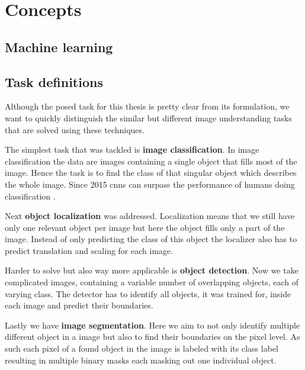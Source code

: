 %
\chapter{Concepts}
\label{sec:concepts}


\section{Machine learning}
\label{sec:concepts:ml}

\section{Task definitions}
\label{sec:concepts:tasks}
Although the posed task for this thesis is pretty clear from its formulation, we want to quickly distinguish the similar but different image understanding tasks that are solved using these techniques.

The simplest task that was tackled is \textbf{image classification}. In image classification the data are images containing a single object that fills most of the image. Hence the task is to find the class of that singular object which describes the whole image. Since 2015 \glspl{cnn} can surpass the performance of humans doing classification \citep{he_delving_2015}.

Next \textbf{object localization} was addressed. Localization means that we still have only one relevant object per image but here the object fills only a part of the image. Instead of only predicting the class of this object the localizer also has to predict translation and scaling for each image.

Harder to solve but also way more applicable is \textbf{object detection}. Now we take complicated images, containing a variable number of overlapping objects, each of varying class. The detector has to identify all objects, it was trained for, inside each image and predict their boundaries.

Lastly we have \textbf{image segmentation}. Here we aim to not only identify multiple different object in a image but also to find their boundaries on the pixel level. As such each pixel of a found object in the image is labeled with its class label resulting in multiple binary masks each masking out one individual object.

